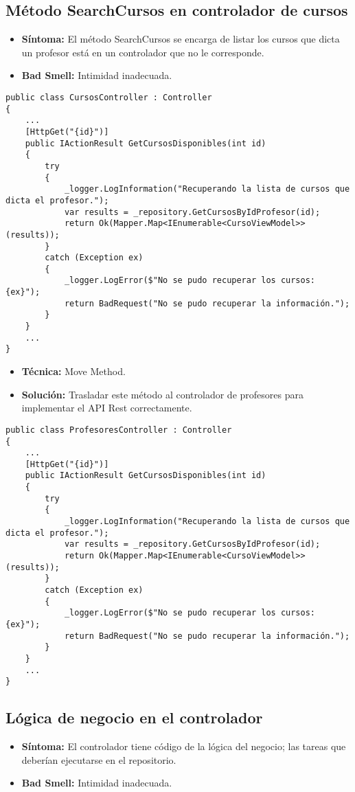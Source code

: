 
\subsection{Método SearchCursos en controlador de cursos}
\begin{itemize}
	\item \textbf{Síntoma:} El método SearchCursos se encarga de listar los cursos que dicta un profesor está en un controlador que no le corresponde.
	\item \textbf{Bad Smell:} Intimidad inadecuada.
\end{itemize}

\begin{lstlisting}[language={[Sharp]C}]
public class CursosController : Controller
{
	...	
	[HttpGet("{id}")]
	public IActionResult GetCursosDisponibles(int id)
	{
		try
		{
			_logger.LogInformation("Recuperando la lista de cursos que dicta el profesor.");
			var results = _repository.GetCursosByIdProfesor(id);
			return Ok(Mapper.Map<IEnumerable<CursoViewModel>>(results));
		}
		catch (Exception ex)
		{
			_logger.LogError($"No se pudo recuperar los cursos: {ex}");
			return BadRequest("No se pudo recuperar la información.");
		}
	}	
	...
}
\end{lstlisting}

\begin{itemize}
	\item \textbf{Técnica:} Move Method.
	\item \textbf{Solución:} Trasladar este método al controlador de profesores para implementar el API Rest correctamente. 
\end{itemize}

\begin{lstlisting}[language={[Sharp]C}]
public class ProfesoresController : Controller
{
	...
	[HttpGet("{id}")]
	public IActionResult GetCursosDisponibles(int id)
	{
		try
		{
			_logger.LogInformation("Recuperando la lista de cursos que dicta el profesor.");
			var results = _repository.GetCursosByIdProfesor(id);
			return Ok(Mapper.Map<IEnumerable<CursoViewModel>>(results));
		}
		catch (Exception ex)
		{
			_logger.LogError($"No se pudo recuperar los cursos: {ex}");
			return BadRequest("No se pudo recuperar la información.");
		}
	}	
	...
}
\end{lstlisting}


\subsection{Lógica de negocio en el controlador}
\begin{itemize}
	\item \textbf{Síntoma:} El controlador tiene código de la lógica del negocio; las tareas que deberían ejecutarse en el repositorio.
	\item \textbf{Bad Smell:} Intimidad inadecuada.
\end{itemize}

